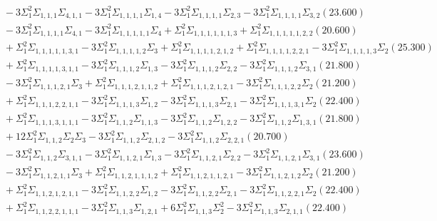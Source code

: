\documentclass[12pt]{article}
\begin{document}
\begin{landscape}
\begin{align*}
		&\quad\quad -3\Sigma_{1}^{2}\Sigma_{1,1,1}\Sigma_{4,1,1}-3\Sigma_{1}^{2}\Sigma_{1,1,1,1}\Sigma_{1,4}-3\Sigma_{1}^{2}\Sigma_{1,1,1,1}\Sigma_{2,3}-3\Sigma_{1}^{2}\Sigma_{1,1,1,1}\Sigma_{3,2}(23.600) \\ 
		&\quad\quad -3\Sigma_{1}^{2}\Sigma_{1,1,1,1}\Sigma_{4,1}-3\Sigma_{1}^{2}\Sigma_{1,1,1,1,1}\Sigma_{4}+\Sigma_{1}^{2}\Sigma_{1,1,1,1,1,1,3}+\Sigma_{1}^{2}\Sigma_{1,1,1,1,1,2,2}(20.600) \\ 
		&\quad\quad +\Sigma_{1}^{2}\Sigma_{1,1,1,1,1,3,1}-3\Sigma_{1}^{2}\Sigma_{1,1,1,1,2}\Sigma_{3}+\Sigma_{1}^{2}\Sigma_{1,1,1,1,2,1,2}+\Sigma_{1}^{2}\Sigma_{1,1,1,1,2,2,1}-3\Sigma_{1}^{2}\Sigma_{1,1,1,1,3}\Sigma_{2}(25.300) \\ 
		&\quad\quad +\Sigma_{1}^{2}\Sigma_{1,1,1,1,3,1,1}-3\Sigma_{1}^{2}\Sigma_{1,1,1,2}\Sigma_{1,3}-3\Sigma_{1}^{2}\Sigma_{1,1,1,2}\Sigma_{2,2}-3\Sigma_{1}^{2}\Sigma_{1,1,1,2}\Sigma_{3,1}(21.800) \\ 
		&\quad\quad -3\Sigma_{1}^{2}\Sigma_{1,1,1,2,1}\Sigma_{3}+\Sigma_{1}^{2}\Sigma_{1,1,1,2,1,1,2}+\Sigma_{1}^{2}\Sigma_{1,1,1,2,1,2,1}-3\Sigma_{1}^{2}\Sigma_{1,1,1,2,2}\Sigma_{2}(21.200) \\ 
		&\quad\quad +\Sigma_{1}^{2}\Sigma_{1,1,1,2,2,1,1}-3\Sigma_{1}^{2}\Sigma_{1,1,1,3}\Sigma_{1,2}-3\Sigma_{1}^{2}\Sigma_{1,1,1,3}\Sigma_{2,1}-3\Sigma_{1}^{2}\Sigma_{1,1,1,3,1}\Sigma_{2}(22.400) \\ 
		&\quad\quad +\Sigma_{1}^{2}\Sigma_{1,1,1,3,1,1,1}-3\Sigma_{1}^{2}\Sigma_{1,1,2}\Sigma_{1,1,3}-3\Sigma_{1}^{2}\Sigma_{1,1,2}\Sigma_{1,2,2}-3\Sigma_{1}^{2}\Sigma_{1,1,2}\Sigma_{1,3,1}(21.800) \\ 
		&\quad\quad +12\Sigma_{1}^{2}\Sigma_{1,1,2}\Sigma_{2}\Sigma_{3}-3\Sigma_{1}^{2}\Sigma_{1,1,2}\Sigma_{2,1,2}-3\Sigma_{1}^{2}\Sigma_{1,1,2}\Sigma_{2,2,1}(20.700) \\ 
		&\quad\quad -3\Sigma_{1}^{2}\Sigma_{1,1,2}\Sigma_{3,1,1}-3\Sigma_{1}^{2}\Sigma_{1,1,2,1}\Sigma_{1,3}-3\Sigma_{1}^{2}\Sigma_{1,1,2,1}\Sigma_{2,2}-3\Sigma_{1}^{2}\Sigma_{1,1,2,1}\Sigma_{3,1}(23.600) \\ 
		&\quad\quad -3\Sigma_{1}^{2}\Sigma_{1,1,2,1,1}\Sigma_{3}+\Sigma_{1}^{2}\Sigma_{1,1,2,1,1,1,2}+\Sigma_{1}^{2}\Sigma_{1,1,2,1,1,2,1}-3\Sigma_{1}^{2}\Sigma_{1,1,2,1,2}\Sigma_{2}(21.200) \\ 
		&\quad\quad +\Sigma_{1}^{2}\Sigma_{1,1,2,1,2,1,1}-3\Sigma_{1}^{2}\Sigma_{1,1,2,2}\Sigma_{1,2}-3\Sigma_{1}^{2}\Sigma_{1,1,2,2}\Sigma_{2,1}-3\Sigma_{1}^{2}\Sigma_{1,1,2,2,1}\Sigma_{2}(22.400) \\ 
		&\quad\quad +\Sigma_{1}^{2}\Sigma_{1,1,2,2,1,1,1}-3\Sigma_{1}^{2}\Sigma_{1,1,3}\Sigma_{1,2,1}+6\Sigma_{1}^{2}\Sigma_{1,1,3}\Sigma_{2}^{2}-3\Sigma_{1}^{2}\Sigma_{1,1,3}\Sigma_{2,1,1}(22.400) \\ 

\end{align*}
\end{landscape}
\end{document}
